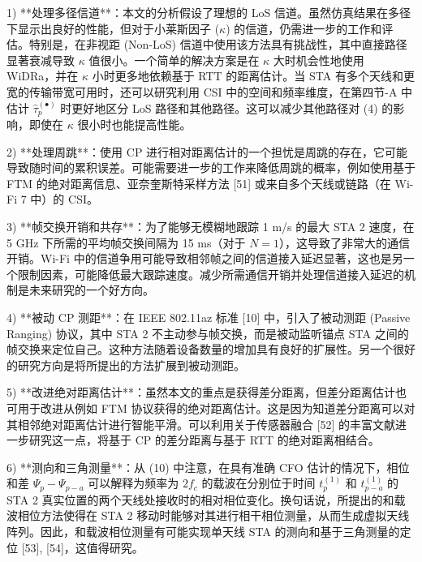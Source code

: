 \documentclass[journal]{IEEEtran}
\begin{document}
1) **处理多径信道**：本文的分析假设了理想的 LoS 信道。虽然仿真结果在多径下显示出良好的性能，但对于小莱斯因子 ($\kappa$) 的信道，仍需进一步的工作和评估。特别是，在非视距 (Non-LoS) 信道中使用该方法具有挑战性，其中直接路径显著衰减导致 $\kappa$ 值很小。一个简单的解决方案是在 $\kappa$ 大时机会性地使用 WiDRa，并在 $\kappa$ 小时更多地依赖基于 RTT 的距离估计。当 STA 有多个天线和更宽的传输带宽可用时，还可以研究利用 CSI 中的空间和频率维度，在第四节-A 中估计 $\hat{\tau}_p^{(\bullet)}$ 时更好地区分 LoS 路径和其他路径。这可以减少其他路径对 (4) 的影响，即使在 $\kappa$ 很小时也能提高性能。

2) **处理周跳**：使用 CP 进行相对距离估计的一个担忧是周跳的存在，它可能导致随时间的累积误差。可能需要进一步的工作来降低周跳的概率，例如使用基于 FTM 的绝对距离信息、亚奈奎斯特采样方法 [51] 或来自多个天线或链路（在 Wi-Fi 7 中）的 CSI。

3) **帧交换开销和共存**：为了能够无模糊地跟踪 1 m/s 的最大 STA 2 速度，在 5 GHz 下所需的平均帧交换间隔为 15 ms（对于 $N=1$），这导致了非常大的通信开销。Wi-Fi 中的信道争用可能导致相邻帧之间的信道接入延迟显著，这也是另一个限制因素，可能降低最大跟踪速度。减少所需通信开销并处理信道接入延迟的机制是未来研究的一个好方向。

4) **被动 CP 测距**：在 IEEE 802.11az 标准 [10] 中，引入了被动测距 (Passive Ranging) 协议，其中 STA 2 不主动参与帧交换，而是被动监听锚点 STA 之间的帧交换来定位自己。这种方法随着设备数量的增加具有良好的扩展性。另一个很好的研究方向是将所提出的方法扩展到被动测距。

5) **改进绝对距离估计**：虽然本文的重点是获得差分距离，但差分距离估计也可用于改进从例如 FTM 协议获得的绝对距离估计。这是因为知道差分距离可以对其相邻绝对距离估计进行智能平滑。可以利用关于传感器融合 [52] 的丰富文献进一步研究这一点，将基于 CP 的差分距离与基于 RTT 的绝对距离相结合。

6) **测向和三角测量**：从 (10) 中注意，在具有准确 CFO 估计的情况下，相位和差 $\Psi_p - \Psi_{p-a}$ 可以解释为频率为 $2f_c$ 的载波在分别位于时间 $t_p^{(1)}$ 和 $t_{p-a}^{(1)}$ 的 STA 2 真实位置的两个天线处接收时的相对相位变化。换句话说，所提出的和载波相位方法使得在 STA 2 移动时能够对其进行相干相位测量，从而生成虚拟天线阵列。因此，和载波相位测量有可能实现单天线 STA 的测向和基于三角测量的定位 [53], [54]，这值得研究。
\end{document}
